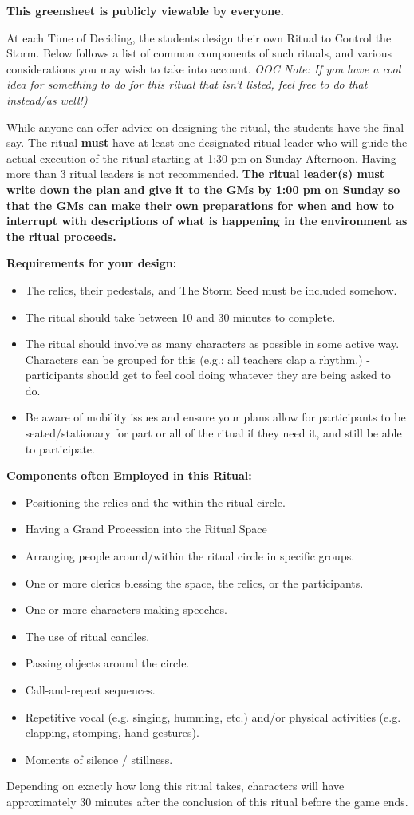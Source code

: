 \documentclass[green]{GL2020}
\begin{document}
\name{\gRitualControlStorm{}}
\textbf{This greensheet is publicly viewable by everyone.}

At each Time of Deciding, the students design their own Ritual to Control the Storm. Below follows a list of common components of such rituals, and various considerations you may wish to take into account. \emph{OOC Note: If you have a cool idea for something to do for this ritual that isn’t listed, feel free to do that instead/as well!)}

While anyone can offer advice on designing the ritual, the students have the final say. The ritual \textbf{must} have at least one designated ritual leader who will guide the actual execution of the ritual starting at 1:30 pm on Sunday Afternoon. Having more than 3 ritual leaders is not recommended. \textbf{The ritual leader(s) must write down the plan and give it to the GMs by 1:00 pm on Sunday so that the GMs can make their own preparations for when and how to interrupt with descriptions of what is happening in the environment as the ritual proceeds.}

\textbf{Requirements for your design:}
\begin{itemize}
  \item The relics, their pedestals, and The Storm Seed must be included somehow.
  \item The ritual should take between 10 and 30 minutes to complete.
  \item The ritual should involve as many characters as possible in some active way. Characters can be grouped for this (e.g.: all teachers clap a rhythm.) - participants should get to feel cool doing whatever they are being asked to do.
  \item Be aware of mobility issues and ensure your plans allow for participants to be seated/stationary for part or all of the ritual if they need it, and still be able to participate.
\end{itemize}

\textbf{Components often Employed in this Ritual:}
\begin{itemize}
  \item Positioning the relics and the \sStormSeed{} within the ritual circle.
  \item Having a Grand Procession into the Ritual Space 
  \item Arranging people around/within the ritual circle in specific groups.
  \item One or more clerics blessing the space, the relics, or the participants.
  \item One or more characters making speeches.
  \item The use of ritual candles.
  \item Passing objects around the circle.
  \item Call-and-repeat sequences.
  \item Repetitive vocal (e.g. singing, humming, etc.) and/or physical activities (e.g. clapping, stomping, hand gestures).
  \item Moments of silence / stillness.
\end{itemize}

Depending on exactly how long this ritual takes, characters will have approximately 30 minutes after the conclusion of this ritual before the game ends.
\end{document}
